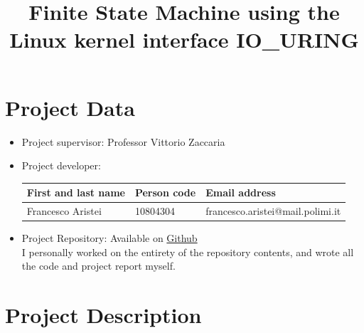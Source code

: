 \documentclass[10pt, oneside,english]{article}   	%
\title{Finite State Machine using the Linux kernel interface IO\_URING \\}
\affil[ ]{Francesco Aristei}
\begin{document}
    
\maketitle    

\tableofcontents
\newpage

\section{Project Data}

\begin{itemize}
    \item
    Project supervisor: Professor Vittorio Zaccaria
    \item
    Project developer:
    \begin{center}
        \begin{tabular}{lll}
            First and last name & Person code & Email address\\
            \hline
            Francesco Aristei & 10804304 & francesco.aristei@mail.polimi.it \\
        \end{tabular}
    \end{center}

    \item
    Project Repository: Available on \href{https://github.com/francescoaristei/io_uring_fsm}{Github} \\
    I personally worked on the entirety of the repository contents, and wrote all the code and project report myself.

\end{itemize}


\section{Project Description}
\end{document}
